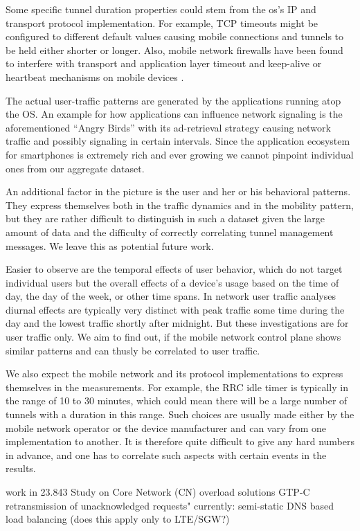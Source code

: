 Some specific tunnel duration properties could stem from the \gls{os}'s IP and transport protocol implementation. For example, TCP timeouts might be configured to different default values causing mobile connections and tunnels to be held either shorter or longer. Also, mobile network firewalls have been found to interfere with transport and application layer timeout and keep-alive or heartbeat mechanisms on mobile devices \cite{sigcomm11middleboxes}.

The actual user-traffic patterns are generated by the applications running atop the OS. An example for how applications can influence network signaling is the aforementioned ``Angry Birds'' with its ad-retrieval strategy causing network traffic and possibly signaling in certain intervals. Since the application ecosystem for smartphones is extremely rich and ever growing we cannot pinpoint individual ones from our aggregate dataset.

An additional factor in the picture is the user and her or his behavioral patterns. They express themselves both in the traffic dynamics and in the mobility pattern, but they are rather difficult to distinguish in such a dataset given the large amount of data and the difficulty of correctly correlating tunnel management messages. We leave this as potential future work.

Easier to observe are the temporal effects of user behavior, which do not target individual users but the overall effects of a device's usage based on the time of day, the day of the week, or other time spans. In network user traffic analyses diurnal effects are typically very distinct with peak traffic some time during the day and the lowest traffic shortly after midnight. But these investigations are for user traffic only. We aim to find out, if the mobile network control plane shows similar patterns and can thusly be correlated to user traffic.

We also expect the mobile network and its protocol implementations to express themselves in the measurements. For example, the \gls{RRC} idle timer is typically in the range of 10 to 30 minutes, which could mean there will be a large number of tunnels with a duration in this range. Such choices are usually made either by the mobile network operator or the device manufacturer and can vary from one implementation to another. It is therefore quite difficult to give any hard numbers in advance, and one has to correlate such aspects with certain events in the results.


work in 23.843 \cite{3gpp.23.843} Study on Core Network (CN) overload solutions
GTP-C retransmission of unacknowledged requests"
currently: semi-static DNS based load balancing (does this apply only to LTE/SGW?)